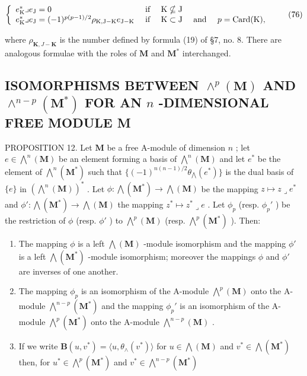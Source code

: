 \[
\left\{ \begin{array}{l l} e _ {\mathrm{K}} ^ {*} \lrcorner e _ {\mathrm{J}} = 0 & \text { if } \quad \mathrm{K} \nsubseteq \mathrm{J} \\ e _ {\mathrm{K}} ^ {*} \lrcorner e _ {\mathrm{J}} = (- 1) ^ {p (p - 1) / 2} \rho_ {\mathrm{K}, \mathrm{J} - \mathrm{K}} e _ {\mathrm{J} - \mathrm{K}} & \text { if } \quad \mathrm{K} \subset \mathrm{J} \quad \text { and } \quad p = \operatorname{Card} (\mathrm{K}), \end{array} \right.\tag{76}
\]

where \(\rho_{\mathbf{K},J - \mathbf{K}}\) is the number defined by formula (19) of §7, no. 8. There are analogous formulae with the roles of \(\mathbf{M}\) and \(\mathbf{M}^*\) interchanged.

\subsection{\texorpdfstring{ISOMORPHISMS BETWEEN \(\wedge^{p}(\mathbf{M})\) AND \(\wedge^{n - p}(\mathbf{M}^{*})\) FOR AN \(n\) -DIMENSIONAL FREE MODULE M}{ISOMORPHISMS BETWEEN \textbackslash wedge\^{}\{p\}(\textbackslash mathbf\{M\}) AND \textbackslash wedge\^{}\{n - p\}(\textbackslash mathbf\{M\}\^{}\{*\}) FOR AN n -DIMENSIONAL FREE MODULE M}}

PROPOSITION 12. Let \(\mathbf{M}\) be a free A-module of dimension \(n\) ; let \(e \in \bigwedge^{n}(\mathbf{M})\) be an element forming a basis of \(\bigwedge^{n}(\mathbf{M})\) and let \(e^{*}\) be the element of \(\bigwedge^{n}(\mathbf{M}^{*})\) such that \(\{(-1)^{n(n-1)/2} \theta_{\bigwedge}(e^{*})\}\) is the dual basis of \(\{e\}\) in \((\bigwedge^{n}(\mathbf{M}))^{*}\) . Let \(\phi: \bigwedge(\mathbf{M}^{*}) \to \bigwedge(\mathbf{M})\) be the mapping \(z \mapsto z \lrcorner e^{*}\) and \(\phi': \bigwedge(\mathbf{M}^{*}) \to \bigwedge(\mathbf{M})\) the mapping \(z^{*} \mapsto z^{*} \lrcorner e\) . Let \(\phi_{p}\) (resp. \(\phi_{p}'\) ) be the restriction of \(\phi\) (resp. \(\phi'\) ) to \(\bigwedge^{p}(\mathbf{M})\) (resp. \(\bigwedge^{p}(\mathbf{M}^{*})\) ). Then:

\begin{enumerate}
\def\labelenumi{(\roman{enumi})}
\item
  The mapping \(\phi\) is a left \(\bigwedge (\mathbf{M})\) -module isomorphism and the mapping \(\phi'\) is a left \(\bigwedge (\mathbf{M}^*)\) -module isomorphism; moreover the mappings \(\phi\) and \(\phi'\) are inverses of one another.
\item
  The mapping \(\phi_p\) is an isomorphism of the A-module \(\bigwedge^p (\mathbf{M})\) onto the A-module \(\bigwedge^{n - p}(\mathbf{M}^*)\) and the mapping \(\phi_p'\) is an isomorphism of the A-module \(\bigwedge^p (\mathbf{M}^*)\) onto the A-module \(\bigwedge^{n - p}(\mathbf{M})\) .
\item
  If we write \(\mathbf{B}(u,v^{*}) = \langle u,\theta_{\wedge}(v^{*})\rangle\) for \(u\in \bigwedge (\mathbf{M})\) and \(v^{*}\in \bigwedge (\mathbf{M}^{*})\) then, for \(u^{*}\in \bigwedge^{p}(\mathbf{M}^{*})\) and \(v^{*}\in \bigwedge^{n - p}(\mathbf{M}^{*})\)
\end{enumerate}

